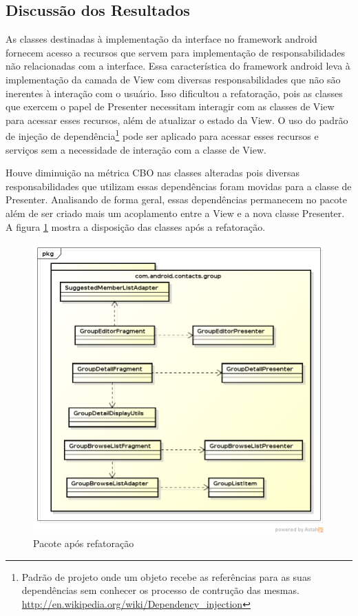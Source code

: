 \documentclass[conference]{IEEEtran}
\begin{document}
\subsection{Discussão dos Resultados} 




As classes destinadas à implementação da interface no framework android fornecem
acesso a recursos que servem para implementação de responsabilidades não
relacionadas com a interface. Essa característica do framework android leva à
implementação da camada de View com diversas responsabilidades que não são
inerentes à interação com o usuário. Isso dificultou a refatoração, pois as
classes que exercem o papel de Presenter necessitam interagir com as classes de
View para acessar esses recursos, além de atualizar o estado da View. O uso do
padrão de injeção de
dependência\footnote{Padrão
de projeto onde um objeto recebe as referências para as suas dependências sem
conhecer os processo de contrução das mesmas.
\url{http://en.wikipedia.org/wiki/Dependency_injection}}
pode ser aplicado para acessar esses recursos e serviços sem a necessidade de
interação com a classe de View.

Houve diminuição na métrica CBO nas classes alteradas pois diversas
responsabilidades que utilizam essas dependências foram movidas para a classe de
Presenter. Analisando de forma geral, essas dependências permanecem no pacote
além de ser criado mais um acoplamento entre a View e a nova classe Presenter.
A figura \ref{fig:classes_iteracao3} mostra a disposição das classes após a
refatoração.

\begin{figure}[htb]
	\begin{center}
		\includegraphics[scale=0.4]{img/classes_iteracao3}
	\end{center}
	\caption{\label{fig:classes_iteracao3} Pacote após refatoração}
	
\end{figure}
\end{document}
